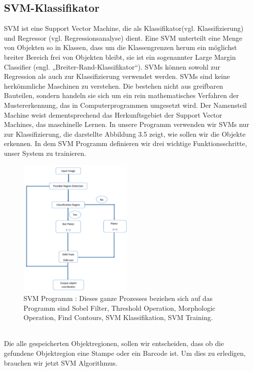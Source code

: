\documentclass[10pt,a4paper]{report}
\begin{document}
\subsection{SVM-Klassifikator}
SVM ist eine Support Vector Machine, die als Klassifikator(vgl. Klassifizierung) und Regressor (vgl. Regressionsanalyse) dient. Eine SVM unterteilt eine Menge von Objekten so in Klassen, dass um die Klassengrenzen herum ein möglichst breiter Bereich frei von Objekten bleibt, sie ist ein sogenannter Large Margin Classifier (engl. „Breiter-Rand-Klassifikator“). SVMs können sowohl zur Regression als auch zur Klassifizierung verwendet werden\cite{4}.
SVMs sind keine herkömmliche Maschinen zu verstehen. Die bestehen  nicht aus greifbaren Bauteilen, sondern handeln sie sich um ein rein mathematisches Verfahren der Mustererkennung, das in Computerprogrammen umgesetzt wird. Der Namensteil Machine weist dementsprechend das Herkunftsgebiet der Support Vector Machines, das maschinelle Lernen.
In unsere Programm verwenden wir SVMs nur zur Klassifizierung, die darstellte Abbildung 3.5 zeigt, wie sollen wir die Objekte erkennen. In dem SVM Programm definieren wir drei wichtige Funktionsschritte, unser System zu trainieren.\\
\begin{figure}[htbp] 
	\centering
	\includegraphics[width=0.5\textwidth]{SVM.png}
	\caption{SVM Programm : Dieses ganze Prozesses beziehen sich auf das Programm sind Sobel Filter, Threshold Operation, Morphologic Operation, Find Contours, SVM Klassifikation, SVM Training.}
	\label{fig:Bild 6}
\end{figure}\\
Die alle gespeicherten Objektregionen, sollen wir entscheiden, dass ob die gefundene Objektregion eine Stampe oder ein Barcode ist. Um dies zu erledigen, brauchen wir jetzt SVM Algorithmus. 
\end{document}
